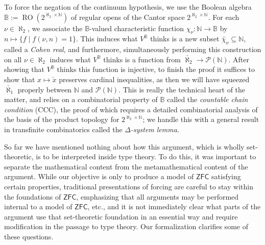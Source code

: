 \documentclass[a4paper,USenglish,cleveref, autoref]{lipics-v2019}
\newcommand{\B}{\mathbb{B}}
\theoremstyle{theorem}
\theoremstyle{definition}
\begin{document}
To force the negation of the continuum hypothesis, we use the Boolean algebra $\B := \operatorname{RO}(2^{\aleph_2 \times \mathbb{N}})$ of regular opens of the Cantor space $2^{\aleph_2 \times \mathbb{N}}$. For each $\nu \in \aleph_2$, we associate the $\B$-valued characteristic function $\chi_\nu : \mathbb{N} \to \B$ by $n \mapsto \{f \operatorname{|} f(\nu, n) = 1\}$. This induces what $V^\B$ thinks is a new subset $\widetilde{\chi_{\nu}} \subseteq \mathbb{N}$, called a \emph{Cohen real}, and furthermore, simultaneously performing this construction on all $\nu \in \aleph_2$ induces what $V^\B$ thinks is a function from $\check{\aleph_2} \to \mathcal{P}(\mathbb{N})$. After showing that $V^\B$ thinks this function is injective, to finish the proof it suffices to show that $x \mapsto \check{x}$ preserves cardinal inequalities, as then we will have squeezed $\check{\aleph_1}$ properly between $\mathbb{N}$ and $\mathcal{P}(\mathbb{N})$. This is really the technical heart of the matter, and relies on a combinatorial property of $\B$ called the \emph{countable chain condition} (CCC), the proof of which requires a detailed combinatorial analysis of the basis of the product topology for $2^{\aleph_2 \times \mathbb{N}}$; we handle this with a general result in transfinite combinatorics called the \emph{$\Delta$-system lemma}.

So far we have mentioned nothing about how this argument, which is wholly set-theoretic, is to be interpreted inside type theory. To do this, it was important to separate the mathematical content from the metamathematical content of the argument. While our objective is only to produce a model of $\mathsf{ZFC}$ satisfying certain properties, traditional presentations of forcing are careful to stay within the foundations of $\mathsf{ZFC}$, emphasizing that all arguments may be performed internal to a model of $\mathsf{ZFC}$, etc., and it is not immediately clear what parts of the argument use that set-theoretic foundation in an essential way %
and require modification in the passage to type theory. Our formalization clarifies some of these questions.
\end{document}
